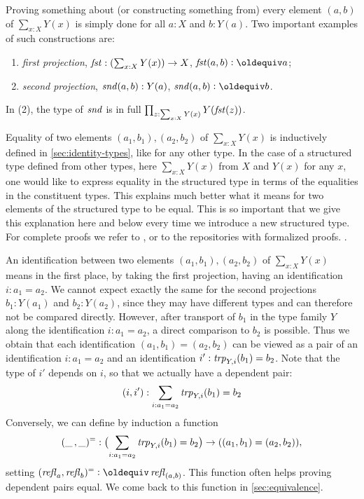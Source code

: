 Proving something about (or constructing something from) every 
element $(a,b)$ of $\sum _{x:X} Y(x)$ is simply done for all $a:X$ and $b: Y(a)$.
Two important examples of such constructions are:
\begin{enumerate}
\item \emph{first projection}, 
$\mathop{\mathit{fst}}:(\sum _{x:X} Y(x)) \to X$, 
$\fst(a,b)\defeq a$;
\item \emph{second projection},
$\mathop{\mathit{snd}}(a,b): Y(a)$,
$\snd(a,b)\defeq b$.
\end{enumerate}
In (2), the type of $\mathop{\mathit{snd}}$ is in full
$\prod_{z:\sum_{x:X} Y(x)} Y(\mathop{\mathit{fst}}(z))$.

Equality of two elements $(a_1,b_1),(a_2,b_2)$ of $\sum _{x:X} Y(x)$ is 
inductively defined in \cref{sec:identity-types}, like for any other type.
In the case of a structured type defined from other types, 
here $\sum _{x:X} Y(x)$ from $X$ and $Y(x)$ for any $x$,
one would like to express equality in the structured type in terms of 
the equalities in the constituent types. This explains much better
what it means for two elements of the structured type to be equal.
This is so important that we give this explanation here and below
every time we introduce a new structured type. 
For complete proofs we refer to \cite{hottbook}, or to the
repositories with formalized proofs. .

An identification between two elements $(a_1,b_1),(a_2,b_2)$ of 
$\sum _{x:X} Y(x)$ means in the first place, by taking
the first projection, having an identification $i: a_1=a_2$.
We cannot expect exactly the same for the second 
projections $b_1: Y(a_1)$ and $b_2: Y(a_2)$, since they may
have different types and can therefore not be compared directly.
However, after transport of $b_1$ in the type family $Y$
along the identification $i: a_1=a_2$, a direct comparison to $b_2$
is possible. Thus we obtain that each identification $(a_1,b_1)=(a_2,b_2)$
can be viewed as a pair of an identification $i: a_1=a_2$ and an
identification $i' : \mathord{\mathit{trp}}_{Y,i}(b_1) = b_2$. Note that the type
of $i'$ depends on $i$, so that we actually have a dependent pair:
\[
(i,i'): \sum_{i:a_1 = a_2} \mathord{\mathit{trp}}_{Y,i}(b_1)= b_2
\]
Conversely, we can define by induction a function
\[
(\_\,,\_)^= : \bigl(\sum_{i:a_1 = a_2} \mathord{\mathit{trp}}_{Y,i}(b_1)= b_2\bigr) 
  \to ((a_1,b_1)=(a_2,b_2)),
\]
setting $(\refl{a},\refl{b})^= \defeq \refl{(a,b)}$.
This function often helps proving dependent pairs equal.
We come back to this function in \cref{sec:equivalence}.


